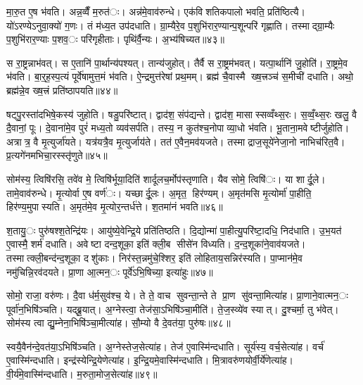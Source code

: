 मा॒रु॒त ए॒ष भ॑वति। अन्न॒व्वैँ म॒रुत॑ः। अन्न॑मे॒वाव॑रुन्धे। एक॑विशतिकपालो भवति॒ प्रति॑ष्ठित्यै। यो॑ऽरण्येऽनुवा॒क्यो॑ ग॒णः। तं म॑ध्य॒त उप॑दधाति। ग्रा॒म्यैरे॒व प॒शुभि॑रार॒ण्यान्प॒शून्परि॑ गृह्णाति। तस्माद्ग्रा॒म्यैः प॒शुभि॑रार॒ण्याः प॒शव॒ः परि॑गृहीताः। पृथि॑र्वै॒न्यः। अ॒भ्य॑षिच्यत॥४३॥

स रा॒ष्ट्रन्नाभ॑वत्। स ए॒तानि॑ पा॒र्थान्य॑पश्यत्। तान्य॑जुहोत्। तैर्वै स रा॒ष्ट्रम॑भवत्। यत्पा॒र्थानि॑ जु॒होति॑। रा॒ष्ट्रमे॒व भ॑वति। बा॒र्॒ह॒स्प॒त्यं पूर्वे॑षामुत्त॒मं भ॑वति। ऐ॒न्द्रमुत्त॑रेषां प्रथ॒मम्। ब्रह्म॑ चै॒वास्मै ख्ष॒त्त्रञ्च॑ स॒मीची॑ दधाति। अथो॒ ब्रह्म॑न्ने॒व ख्ष॒त्त्रं प्रति॑ष्ठापयति॥४४॥

षट्पु॒रस्ता॑दभिषे॒कस्य॑ जुहोति। षडु॒परि॑ष्टात्। द्वाद॑श॒ संप॑द्यन्ते। द्वाद॑श॒ मासास्सव्वँथ्स॒रः। स॒व्वँ॒थ्स॒रः खलु॒ वै दै॒वानां॒ पूः। दे॒वाना॑मे॒व पुरं॑ मध्य॒तो व्यव॑सर्पति। तस्य॒ न कुत॑श्च॒नोपाव्या॒धो भ॑वति। भू॒ताना॒मवेष्टीर्जुहोति। अत्रात्र॒ वै मृ॒त्युर्जा॑यते। यत्र॑यत्रै॒व मृ॒त्युर्जाय॑ते। तत॑ ए॒वैन॒मव॑यजते। तस्माद्राज॒सूये॑नेजा॒नो नाभिच॑रित॒वै। प्र॒त्यगे॑नमभिचा॒रस्स्तृ॑णुते॥४५॥


सोम॑स्य॒ त्विषि॑रसि॒ तवे॑व मे॒ त्विषि॑र्भूया॒दिति॑ शार्दूलच॒र्मोप॑स्तृणाति। यैव सोमे॒ त्विषि॑ः। या शार्दू॒ले। तामे॒वाव॑रुन्धे। मृ॒त्योर्वा ए॒ष वर्ण॑ः। यच्छार्दू॒लः। अ॒मृत॒ हिर॑ण्यम्। अ॒मृत॑मसि मृ॒त्योर्मा॑ पा॒हीति॒ हिर॑ण्य॒मुपास्यति। अ॒मृत॑मे॒व मृ॒त्योर॒न्तर्ध॑त्ते। श॒तमा॑नं भवति॥४६॥

श॒तायु॒ः पुरु॑षश्श॒तेन्द्रि॑यः। आयु॑ष्ये॒वेन्द्रि॒ये प्रति॑तिष्ठति। दि॒द्योन्मा॑ पा॒हीत्यु॒परि॑ष्टा॒दधि॒ निद॑धाति। उ॒भ॒यत॑ ए॒वास्मै॒ शर्म॑ दधाति। अवेष्टा दन्द॒शूका॒ इति॑ क्ली॒ब सीसे॑न विध्यति। द॒न्द॒शूका॑ने॒वाव॑यजते। तस्मात्क्ली॒बन्द॑न्द॒शूका॒ दशु॑काः। निर॑स्त॒न्नमु॑चे॒श्शिर॒ इति॑ लोहिताय॒सन्निर॑स्यति। पा॒प्मान॑मे॒व नमु॑चिन्नि॒रव॑दयते। प्रा॒णा आ॒त्मन॒ः पूर्वे॑ऽभि॒षिच्या॒ इत्या॑हुः॥४७॥

सोमो॒ राजा॒ वरु॑णः। दै॒वा ध॑र्म॒सुव॑श्च॒ ये। ते ते॒ वाच सुवन्ता॒न्ते ते प्रा॒ण सु॑वन्ता॒मित्या॑ह। प्रा॒णाने॒वात्मन॒ः पूर्वा॑न॒भिषि॑ञ्चति। यद्ब्रू॒यात्। अ॒ग्नेस्त्वा॒ तेज॑सा॒ऽभिषि॑ञ्चा॒मीति॑। ते॒ज॒स्व्ये॑व स्यात्। दु॒श्चर्मा॒ तु भ॑वेत्। सोम॑स्य त्वा द्यु॒म्नेना॒भिषि॑ञ्चा॒मीत्या॑ह। सौ॒म्यो वै दे॒वत॑या॒ पुरु॑षः॥४८॥

स्वयै॒वैन॑न्दे॒वत॑या॒ऽभिषि॑ञ्चति। अ॒ग्नेस्तेज॒सेत्या॑ह। तेज॑ ए॒वास्मि॑न्दधाति। सूर्य॑स्य॒ वर्च॒सेत्या॑ह। वर्च॑ ए॒वास्मि॑न्दधाति। इन्द्र॑स्येन्द्रि॒येणेत्या॑ह। इ॒न्द्रि॒यमे॒वास्मि॑न्दधाति। मि॒त्रावरु॑णयोर्वी॒र्ये॑णेत्या॑ह। वी॒र्य॑मे॒वास्मि॑न्दधाति। म॒रुता॒मोज॒सेत्या॑ह॥४९॥

